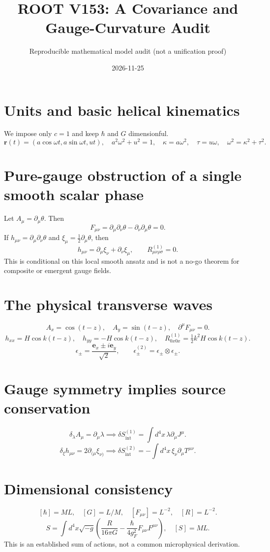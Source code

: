 \documentclass[11pt]{article}
\title{ROOT V153: A Covariance and Gauge-Curvature Audit}
\author{Reproducible mathematical model audit (not a unification proof)}
\date{2026-11-25}
\begin{document}
\maketitle
\section*{Units and basic helical kinematics}
We impose only $c=1$ and keep $\hbar$ and $G$ dimensionful.
\[\mathbf r(t)=(a\cos\omega t,a\sin\omega t,ut),\quad
 a^2\omega^2+u^2=1,\quad
 \kappa=a\omega^2,\quad\tau=u\omega,\quad\omega^2=\kappa^2+\tau^2.\]
\section*{Pure-gauge obstruction of a single smooth scalar phase}
Let $A_\mu=\partial_\mu\theta$. Then
\[F_{\mu\nu}=\partial_\mu\partial_\nu\theta-\partial_\nu\partial_\mu\theta=0.\]
If $h_{\mu\nu}=\partial_\mu\partial_\nu\theta$ and $\xi_\mu=\tfrac12\partial_\mu\theta$, then
\[h_{\mu\nu}=\partial_\mu\xi_\nu+\partial_\nu\xi_\mu,\qquad
 R^{(1)}_{\mu\nu\rho\sigma}=0.\]
This is conditional on this local smooth ansatz and is not a no-go theorem for composite or emergent gauge fields.
\section*{The physical transverse waves}
\[A_x=\cos(t-z),\quad A_y=\sin(t-z),\quad\partial^\mu F_{\mu\nu}=0.\]
\[h_{xx}=H\cos k(t-z),\quad h_{yy}=-H\cos k(t-z),\quad
 R^{(1)}_{0x0x}=\tfrac12k^2 H\cos k(t-z).\]
\[\epsilon_\pm=\frac{\mathbf e_x\pm i\mathbf e_y}{\sqrt2},\qquad
 \epsilon^{(2)}_\pm=\epsilon_\pm\otimes\epsilon_\pm.\]
\section*{Gauge symmetry implies source conservation}
\[\delta_\lambda A_\mu=\partial_\mu\lambda
\implies \delta S_{\mathrm{int}}^{(1)}=\int d^4x\,\lambda\partial_\mu J^\mu.\]
\[\delta_\xi h_{\mu\nu}=2\partial_{(\mu}\xi_{\nu)}
\implies\delta S_{\mathrm{int}}^{(2)}=-\int d^4x\,\xi_\nu\partial_\mu T^{\mu\nu}.\]
\section*{Dimensional consistency}
\[[\hbar]=ML,\quad[G]=L/M,\quad[F_{\mu\nu}]=L^{-2},\quad[R]=L^{-2}.\]
\[S=\int d^4x\sqrt{-g}\left(\frac{R}{16\pi G}-\frac{\hbar}{4g_F^2}F_{\mu\nu}F^{\mu\nu}\right),\quad[S]=ML.\]
This is an established sum of actions, not a common microphysical derivation.
\end{document}
